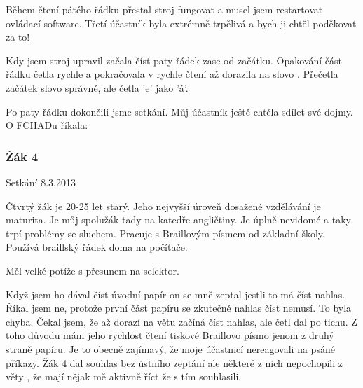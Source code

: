 Během čtení pátého řádku přestal stroj fungovat a musel jsem restartovat ovládací software.  Třetí účastník byla extrémně trpělivá a bych ji chtěl poděkovat za to!

Kdy jsem stroj upravil začala číst paty řádek zase od začátku. Opakování část řádku četla rychle a pokračovala v rychle čtení až dorazila na slovo .  Přečetla začátek slovo správně, ale četla 'e' jako 'á'.

Po paty řádku dokončili jsme setkání. Můj účastník ještě chtěla sdílet své dojmy.  O FCHADu říkala:

\em {} \em

\subsubsection{Žák 4}

Setkání 8.3.2013

Čtvrtý žák je 20-25 let starý.  Jeho nejvyšší úroveň dosažené vzdělávání je maturita.  Je můj spolužák tady na katedře angličtiny. Je úplně nevidomé a taky trpí problémy se sluchem.  Pracuje s Braillovým písmem od základní školy. Používá braillský řádek doma na počítače.

Měl velké potíže s přesunem na selektor.

Když jsem ho dával číst úvodní papír on se mně zeptal jestli to má číst nahlas.  Říkal jsem ne, protože první část papíru se zkutečně nahlas číst nemusí.  To byla chyba.  Čekal jsem, že až dorazí na větu  začíná číst nahlas, ale četl dal po tichu.  Z toho důvodu mám jeho rychlost čtení tiskové Braillovo písmo jenom z druhý straně papíru.  Je to obecně zajímavý, že moje účastnicí nereagovali na psáné příkazy.  Žák 4 dal souhlas bez ústního zeptání ale některé z nich nepochopili z věty , že mají nějak mě aktivně říct že s tím souhlasili.


